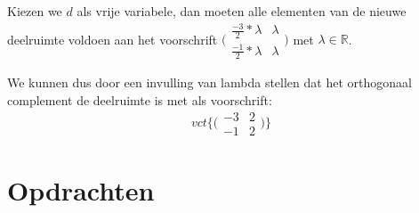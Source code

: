 \documentclass[lineaire_algebra_oplossingen.tex]{subfiles}
\begin{document}
Kiezen we $d$ als vrije variabele, dan moeten alle elementen van de nieuwe deelruimte voldoen aan het voorschrift $\bigl(\begin{smallmatrix}
\frac{-3}{2}*\lambda & \lambda \\
\frac{-1}{2}*\lambda & \lambda
\end{smallmatrix}\bigr)$ met $\lambda \in \mathbb{R}$.

We kunnen dus door een invulling van lambda stellen dat het orthogonaal complement de deelruimte is met als voorschrift:
\[
vct\{\bigl(\begin{smallmatrix}
-3 & 2 \\
-1 & 2
\end{smallmatrix}\bigr)\}
\]

\section{Opdrachten}
\end{document}
